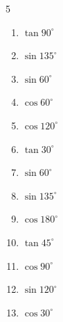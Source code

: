 \begin{multicols}{5}
\begin{enumerate}
\resetques

  \item $\displaystyle \tan{90^\circ}$

        \phantom{$\displaystyle なし$}

  \item $\displaystyle \sin{135^\circ}$


  \item $\displaystyle \sin{60^\circ}$


  \item $\displaystyle \cos{60^\circ}$


  \item $\displaystyle \cos{120^\circ}$


  \item $\displaystyle \tan{30^\circ}$


  \item $\displaystyle \sin{60^\circ}$


  \item $\displaystyle \sin{135^\circ}$


  \item $\displaystyle \cos{180^\circ}$

        \phantom{$\displaystyle =-1$}

  \item $\displaystyle \tan{45^\circ}$

        \phantom{$\displaystyle =1$}

  \item $\displaystyle \cos{90^\circ}$

        \phantom{$\displaystyle =0$}

  \item $\displaystyle \sin{120^\circ}$


  \item $\displaystyle \cos{30^\circ}$


\end{enumerate}
\end{multicols}
